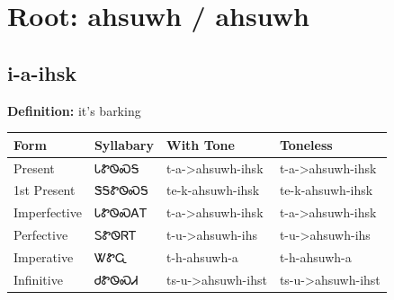 \documentclass{article}%
\begin{document}
%
\normalsize%
\section*{Root: ahsuwh / ahsuwh}%
\subsection*{i-a-ihsk}%
\textbf{Definition: }%
it’s barking%
\\[0.5em]%
\begin{tabular}{|l|l|l|l|}%
\hline%
\textbf{Form}&\textbf{Syllabary}&\textbf{With Tone}&\textbf{Toneless}\\%
\hline%
Present&ᏓᏑᏫᏍᎦ&t{-}a{-}>ahsuwh{-}ihsk&t{-}a{-}>ahsuwh{-}ihsk\\%
1st Present&ᏕᎦᏑᏫᏍᎦ&te{-}k{-}ahsuwh{-}ihsk&te{-}k{-}ahsuwh{-}ihsk\\%
Imperfective&ᏓᏑᏫᏍᎪᎢ&t{-}a{-}>ahsuwh{-}ihsk&t{-}a{-}>ahsuwh{-}ihsk\\%
Perfective&ᏚᏑᏫᏒᎢ&t{-}u{-}>ahsuwh{-}ihs&t{-}u{-}>ahsuwh{-}ihs\\%
Imperative&ᏔᏑᏩ&t{-}h{-}ahsuwh{-}a&t{-}h{-}ahsuwh{-}a\\%
Infinitive&ᏧᏑᏫᏍᏗ&ts{-}u{-}>ahsuwh{-}ihst&ts{-}u{-}>ahsuwh{-}ihst\\%
\hline%
\end{tabular}%
\\[1em]%
\end{document}
